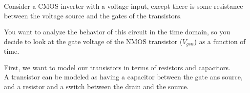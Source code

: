 

Consider a CMOS inverter with a voltage input, except there is some resistance between the voltage source and the gates of the transistors.
\begin{center}
    
\end{center}

You want to analyze the behavior of this circuit in the time domain, so you decide to look at the gate voltage of the NMOS transistor ($V_{gsn}$) as a function of time.

\begin{enumerate}

\qitem First, we want to model our transistors in terms of resistors and capacitors. \\
A transistor can be modeled as having a capacitor between the gate ans source, and a resistor and a switch between the drain and the source.

\end{enumerate}